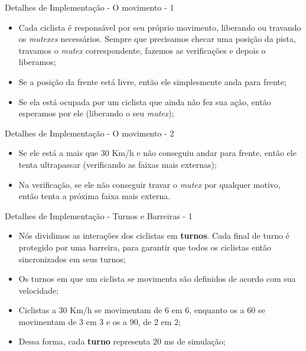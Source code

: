 \documentclass[10pt]{beamer}
\begin{document}
    \begin{frame}{Detalhes de Implementação - O movimento - 1}
      \begin{itemize}
        \justifying
        \item Cada ciclista é responsável por seu próprio movimento, liberando
          ou travando os \textit{mutexes} necessários. Sempre que precisamos
          checar uma posição da pista, travamos o \textit{mutex} correspondente,
          fazemos as verificações e depois o liberamos;
          \item Se a posição da frente está livre, então ele simplesmente anda
          para frente;
        \item Se ela está ocupada por um ciclista que ainda não fez sua ação,
          então esperamos por ele (liberando o seu \textit{mutex});
      \end{itemize}
    \end{frame}

    \begin{frame}{Detalhes de Implementação - O movimento - 2}
      \begin{itemize}
        \justifying
        \item Se ele está a mais que $30$ Km/h e não conseguiu andar para
          frente, então ele tenta ultrapassar (verificando as faixas mais
          externas);
        \item Na verificação, se ele não conseguir travar o
          \textit{mutex} por qualquer motivo, então tenta a próxima faixa mais
          externa.
      \end{itemize}
    \end{frame}

    \begin{frame}{Detalhes de Implementação - Turnos e Barreiras - 1}
      \begin{itemize}
        \justifying
        \item Nós dividimos as interações dos ciclistas em \textbf{turnos}. Cada
          final de turno é protegido por uma barreira, para garantir que todos
          os ciclistas então sincronizados em seus turnos;
        \item Os turnos em que um ciclista se movimenta são definidos de acordo
          com sua velocidade;
        \item Ciclistas a $30$ Km/h se movimentam de $6$ em $6$, enquanto os a
          $60$ se movimentam de $3$ em $3$ e os a $90$, de $2$ em $2$;
        \item Dessa forma, cada \textbf{turno} representa $20$ ms de simulação;
      \end{itemize}
    \end{frame}
\end{document}
